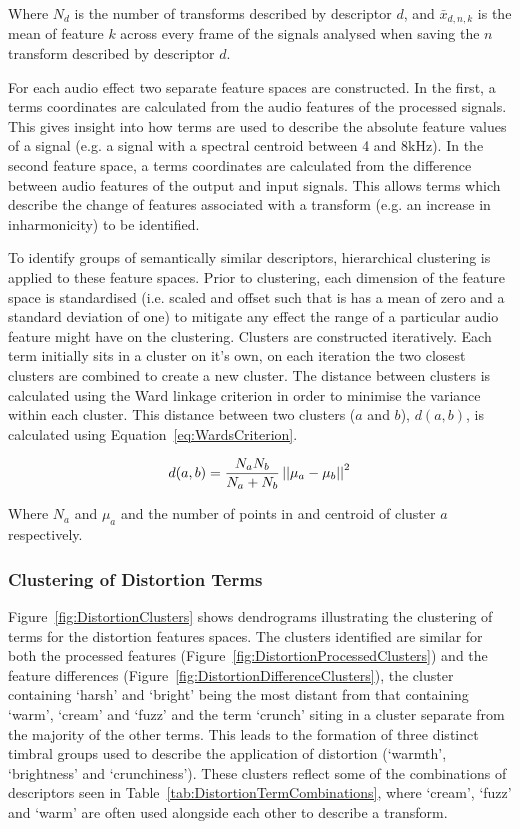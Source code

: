 		Where $N_{d}$ is the number of transforms described by descriptor $d$, and $\bar{x}_{d,n,k}$ is the mean of
		feature $k$ across every frame of the signals analysed when saving the $n$ transform described by
		descriptor $d$.
		
		For each audio effect two separate feature spaces are constructed. In the first, a terms coordinates are
		calculated from the audio features of the processed signals. This gives insight into how terms are used to
		describe the absolute feature values of a signal (e.g. a signal with a spectral centroid between 4 and
		8kHz). In the second feature space, a terms coordinates are calculated from the difference between audio
		features of the output and input signals. This allows terms which describe the change of features
		associated with a transform (e.g. an increase in inharmonicity) to be identified.

		To identify groups of semantically similar descriptors, hierarchical clustering is applied to these feature
		spaces. Prior to clustering, each dimension of the feature space is standardised (i.e. scaled and offset
		such that is has a mean of zero and a standard deviation of one) to mitigate any effect the range of a
		particular audio feature might have on the clustering. Clusters are constructed iteratively. Each term
		initially sits in a cluster on it's own, on each iteration the two closest clusters are combined to create
		a new cluster. The distance between clusters is calculated using the Ward linkage criterion
		\citep{ward1963hierarchical} in order to minimise the variance within each cluster. This distance between
		two clusters ($a$ and $b$), $d(a, b)$, is calculated using Equation~\ref{eq:WardsCriterion}.

		\begin{equation}
			d(a, b) = \frac{N_{a}N_{b}}{N_{a} + N_{b}} \left|\left|\mu_{a} - \mu_{b}\right|\right|^{2}
			\label{eq:WardsCriterion}
		\end{equation}

		Where $N_{a}$ and $\mu_{a}$ and the number of points in and centroid of cluster $a$ respectively.

		\subsubsection*{Clustering of Distortion Terms}
			Figure~\ref{fig:DistortionClusters} shows dendrograms illustrating the clustering of terms for the
			distortion features spaces. The clusters identified are similar for both the processed features
			(Figure~\ref{fig:DistortionProcessedClusters}) and the feature differences
			(Figure~\ref{fig:DistortionDifferenceClusters}), the cluster containing `harsh' and `bright' being
			the most distant from that containing `warm', `cream' and `fuzz' and the term `crunch' siting in a
			cluster separate from the majority of the other terms. This leads to the formation of three
			distinct timbral groups used to describe the application of distortion (`warmth', `brightness' and
			`crunchiness'). These clusters reflect some of the combinations of descriptors seen in
			Table~\ref{tab:DistortionTermCombinations}, where `cream', `fuzz' and `warm' are often used
			alongside each other to describe a transform.

